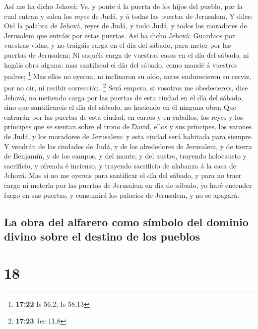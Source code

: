  Así me ha dicho Jehová: Ve, y ponte á la puerta de los
hijos del pueblo, por la cual entran y salen los reyes de Judá, y á
todas las puertas de Jerusalem,  Y diles: Oid la palabra
de Jehová, reyes de Judá, y todo Judá, y todos los moradores de
Jerusalem que entráis por estas puertas.  Así ha dicho
Jehová: Guardaos por vuestras vidas, y no traigáis carga en el día del
sábado, para meter por las puertas de Jerusalem;  Ni
saquéis carga de vuestras casas en el día del sábado, ni hagáis obra
alguna: mas santificad el día del sábado, como mandé á vuestros padres;
\footnote{\textbf{17:22} Is 56,2; Is 58,13}  Mas ellos no
oyeron, ni inclinaron su oído, antes endurecieron su cerviz, por no oir,
ni recibir corrección. \footnote{\textbf{17:23} Jer 11,8}
 Será empero, si vosotros me obedeciereis, dice Jehová,
no metiendo carga por las puertas de esta ciudad en el día del sábado,
sino que santificareis el día del sábado, no haciendo en él ninguna
obra;  Que entrarán por las puertas de esta ciudad, en
carros y en caballos, los reyes y los príncipes que se sientan sobre el
trono de David, ellos y sus príncipes, los varones de Judá, y los
moradores de Jerusalem: y esta ciudad será habitada para siempre.
 Y vendrán de las ciudades de Judá, y de los alrededores
de Jerusalem, y de tierra de Benjamín, y de los campos, y del monte, y
del austro, trayendo holocausto y sacrificio, y ofrenda é incienso, y
trayendo sacrificio de alabanza á la casa de Jehová.  Mas
si no me oyereis para santificar el día del sábado, y para no traer
carga ni meterla por las puertas de Jerusalem en día de sábado, yo haré
encender fuego en sus puertas, y consumirá los palacios de Jerusalem, y
no se apagará.

\hypertarget{la-obra-del-alfarero-como-suxedmbolo-del-dominio-divino-sobre-el-destino-de-los-pueblos}{%
\subsection{La obra del alfarero como símbolo del dominio divino sobre
el destino de los
pueblos}\label{la-obra-del-alfarero-como-suxedmbolo-del-dominio-divino-sobre-el-destino-de-los-pueblos}}

\hypertarget{section-17}{%
\section{18}\label{section-17}}

